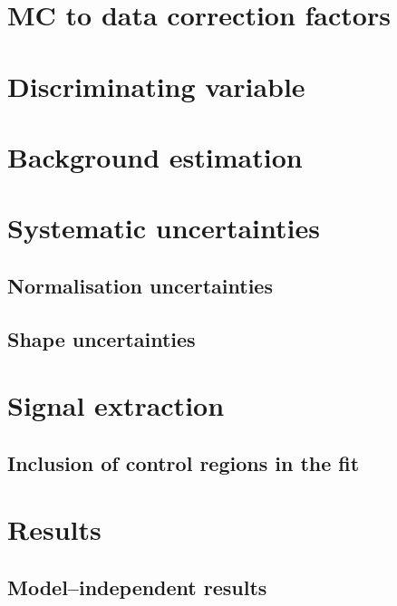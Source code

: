 \section{\ac{MC} to data correction factors}
\label{sec:mssm_mccorrs}

\section{Discriminating variable}
\label{sec:mssm_discrvar}

\section{Background estimation}
\label{sec:mssm_bkgs}

\section{Systematic uncertainties}
\label{sec:mssm_uncs}

\subsection{Normalisation uncertainties}
\label{sec:mssm_uncs_norm}

\subsection{Shape uncertainties}
\label{sec:mssm_uncs_shape}


\section{Signal extraction}
\label{sec:mssm_signalextraction}

\subsection{Inclusion of control regions in the fit}
\label{sec:mssm_sigext_ctrl}

\section{Results}
\label{sec:mssm_results}

\subsection{Model--independent results}
\label{sec:mssm_results_modelindep}

